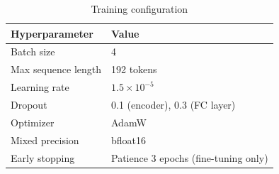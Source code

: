 \begin{table}[h]
\centering
\small
  \renewcommand{\arraystretch}{1.1}
  \begin{tabular}{@{}ll@{}}
  \toprule
  \textbf{Hyperparameter} & \textbf{Value} \\
  \midrule
  Batch size                & 4 \\
  Max sequence length       & 192 tokens \\
  Learning rate             & $1.5 \times 10^{-5}$ \\
  Dropout                   & 0.1 (encoder), 0.3 (FC layer) \\
  Optimizer                 & AdamW \\
  Mixed precision           & bfloat16 \\
  Early stopping            & Patience 3 epochs (fine-tuning only) \\
  \bottomrule
  \end{tabular}
  \caption{Training configuration}
\label{tab:training_hparams}
\end{table}